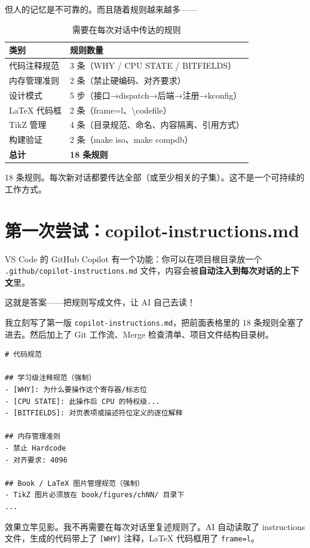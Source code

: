 但人的记忆是不可靠的。而且随着规则越来越多——

\begin{table}[H]
\centering
\small
\begin{tabular}{ll}
\toprule
\textbf{类别} & \textbf{规则数量} \\
\midrule
代码注释规范 & 3 条（WHY / CPU STATE / BITFIELDS） \\
内存管理准则 & 2 条（禁止硬编码、对齐要求） \\
设计模式 & 5 步（接口→dispatch→后端→注册→kconfig） \\
LaTeX 代码框 & 2 条（frame=l、\textbackslash codefile） \\
TikZ 管理 & 4 条（目录规范、命名、内容隔离、引用方式） \\
构建验证 & 2 条（make iso、make compdb） \\
\bottomrule
\textbf{总计} & \textbf{18 条规则} \\
\end{tabular}
\caption{需要在每次对话中传达的规则}
\end{table}

18 条规则。每次新对话都要传达全部（或至少相关的子集）。这不是一个可持续的工作方式。

\section{第一次尝试：copilot-instructions.md}

VS Code 的 GitHub Copilot 有一个功能：你可以在项目根目录放一个 \texttt{.github/copilot-instructions.md} 文件，内容会被\textbf{自动注入到每次对话的上下文}里。

这就是答案——把规则写成文件，让 AI 自己去读！

我立刻写了第一版 \texttt{copilot-instructions.md}，把前面表格里的 18 条规则全塞了进去。然后加上了 Git 工作流、Merge 检查清单、项目文件结构目录树。

\begin{lstlisting}[style=yamlstyle]
# 代码规范

## 学习级注释规范（强制）
- [WHY]: 为什么要操作这个寄存器/标志位
- [CPU STATE]: 此操作后 CPU 的特权级...
- [BITFIELDS]: 对页表项或描述符位定义的逐位解释

## 内存管理准则
- 禁止 Hardcode
- 对齐要求: 4096

## Book / LaTeX 图片管理规范（强制）
- TikZ 图片必须放在 book/figures/chNN/ 目录下
...
\end{lstlisting}

效果立竿见影。我不再需要在每次对话里复述规则了。AI 自动读取了 instructions 文件，生成的代码带上了 \texttt{[WHY]} 注释，LaTeX 代码框用了 \texttt{frame=l}。

